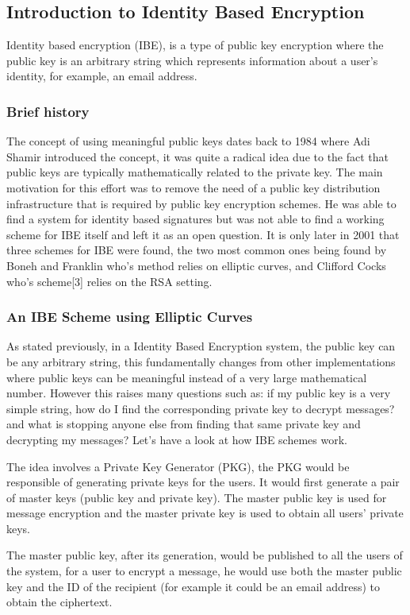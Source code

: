 \documentclass[conference]{IEEEtran}
\begin{document}
\subsection{Introduction to Identity Based Encryption}
Identity based encryption (IBE), is a type of public key encryption 
where the public key is an arbitrary string which represents information
about a user's identity, for example, an email address. 
\subsubsection{Brief history}
The concept of using meaningful public keys dates back to 1984 where Adi Shamir
introduced the concept, it was quite a radical idea due to the fact that 
public keys are typically mathematically related to the private key. The main 
motivation for this effort was to remove the need of a public key distribution
infrastructure that is required by public key encryption schemes.
He was able to find a system for identity based signatures but was not able to 
find a working scheme for IBE itself and left it as an open question. 
It is only later in 2001 that three schemes for IBE 
were found, the two most common ones being 
found by Boneh and Franklin who's method relies on elliptic curves, and 
Clifford Cocks who's scheme[3] relies on the RSA setting.

\subsubsection{An IBE Scheme using Elliptic Curves}
As stated previously, in a Identity Based Encryption system, 
the public key can be any arbitrary string, this fundamentally changes
from other implementations where public keys can be meaningful instead of 
a very large mathematical number. However this raises many questions such as: 
if my public key is a very simple string, how do I find the corresponding private
key to decrypt messages? and what is stopping anyone else from finding that same 
private key and decrypting my messages? Let's have a look at how IBE schemes work.


The idea involves a Private Key Generator (PKG), the PKG would be responsible 
of generating private keys for the users. It would first generate a pair of 
master keys (public key and private key). 
The master public key is used for message encryption and the master
private key is used to obtain all users' private keys.


The master public key, after its generation, would be published to all the users of the system, for a user 
to encrypt a message, he would use both the master public key and the ID of the recipient
(for example it could be an email address) to obtain the ciphertext.
\end{document}
